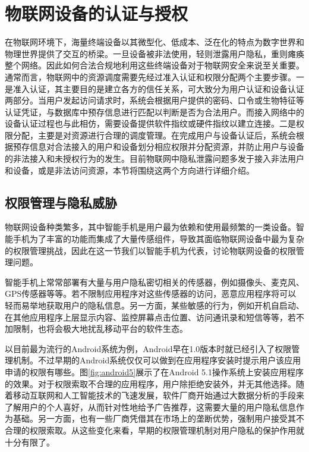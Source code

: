 \section{物联网设备的认证与授权}
\label{protocol_security}

在物联网环境下，海量终端设备以其微型化、低成本、泛在化的特点为数字世界和物理世界提供了交互的桥梁。一旦设备被非法使用，轻则泄露用户隐私，重则瘫痪整个网络。因此如何合法合规地利用这些终端设备对于物联网安全来说至关重要。通常而言，物联网中的资源调度需要先经过准入认证和权限分配两个主要步骤。一是准入认证，其主要目的是建立各方的信任关系，可大致分为用户认证和设备认证两部分。当用户发起访问请求时，系统会根据用户提供的密码、口令或生物特征等认证凭证，与数据库中预存信息进行匹配以判断是否为合法用户。而接入网络中的设备认证过程也与此相仿，需要设备提供软件指纹或硬件指纹以建立连接。二是权限分配，主要是对资源进行合理的调度管理。在完成用户与设备认证后，系统会根据预存信息对合法接入的用户和设备划分相应权限并分配资源，并防止用户与设备的非法接入和未授权行为的发生。目前物联网中隐私泄露问题多发于接入非法用户和设备，或是非法访问资源，本节将围绕这两个方向进行详细介绍。


\subsection{权限管理与隐私威胁}
\label{common_security}

物联网设备种类繁多，其中智能手机是用户最为依赖和使用最频繁的一类设备。智能手机为了丰富的功能而集成了大量传感组件，导致其面临物联网设备中最为复杂的权限管理挑战，因此在这一节我们以智能手机为代表，讨论物联网设备的权限管理问题。

智能手机上常常部署有大量与用户隐私密切相关的传感器，例如摄像头、麦克风、GPS传感器等等。若不限制应用程序对这些传感器的访问，恶意应用程序将可以轻而易举地获取用户的隐私信息。另一方面，某些敏感的行为，例如开机自启动、在其他应用程序上层显示内容、监控屏幕点击位置、访问通讯录和短信等等，若不加限制，也将会极大地扰乱移动平台的软件生态。

以目前最为流行的Android系统为例，Android早在1.0版本时就已经引入了权限管理机制。不过早期的Android系统仅仅可以做到在应用程序安装时提示用户该应用申请的权限有哪些。图\ref{fig:android5}展示了在Android 5.1操作系统上安装应用程序的效果。对于权限索取不合理的应用程序，用户除拒绝安装外，并无其他选择。随着移动互联网和人工智能技术的飞速发展，软件厂商开始通过大数据分析的手段来了解用户的个人喜好，从而针对性地给予广告推荐，这需要大量的用户隐私信息作为基础。另一方面，也有一些厂商凭借其在市场上的垄断优势，强制用户接受其不合理的权限索取。从这些变化来看，早期的权限管理机制对用户隐私的保护作用就十分有限了。


